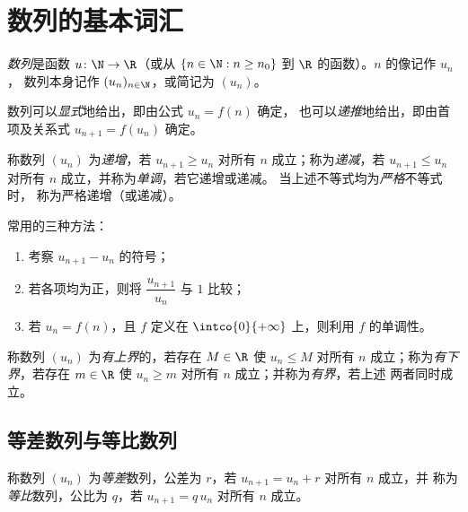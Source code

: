 \section{数列的基本词汇}

\begin{definition}[数列]\label{def:g12:seq:sequence}
\emph{数列}是函数 $u \colon \N \to \R$（或从
$\{n \in \N : n \geq n_0\}$ 到 $\R$ 的函数）。$n$ 的像记作 $u_n$，
数列本身记作 $(u_n)_{n\in\N}$，或简记为 $(u_n)$。
\end{definition}

数列可以\emph{显式}地给出，即由公式 $u_n = f(n)$ 确定，
也可以\emph{递推}地给出，即由首项及关系式 $u_{n+1} = f(u_n)$ 确定。

\begin{definition}[单调性]\label{def:g12:seq:monotonic}
称数列 $(u_n)$ 为\emph{递增}，若
$u_{n+1} \geq u_n$ 对所有 $n$ 成立；称为\emph{递减}，若
$u_{n+1} \leq u_n$ 对所有 $n$ 成立，并称为\emph{单调}，若它递增或递减。
当上述不等式均为\emph{严格}不等式时，
称为严格递增（或递减）。
\end{definition}

\begin{method}[研究数列单调性的方法]\label{met:g12:seq:monotonicity}
常用的三种方法：
\begin{enumerate}
  \item 考察 $u_{n+1} - u_n$ 的符号；
  \item 若各项均为正，则将 $\dfrac{u_{n+1}}{u_n}$ 与 $1$ 比较；
  \item 若 $u_n = f(n)$，且 $f$ 定义在 $\intco{0}{+\infty}$ 上，则利用
        $f$ 的单调性。
\end{enumerate}
\end{method}

\begin{definition}[有界数列]\label{def:g12:seq:bounded}
称数列 $(u_n)$ 为\emph{有上界}的，若存在
$M \in \R$ 使 $u_n \leq M$ 对所有 $n$ 成立；称为\emph{有下界}，若存在
$m \in \R$ 使 $u_n \geq m$ 对所有 $n$ 成立；并称为\emph{有界}，若上述
两者同时成立。
\end{definition}

\subsection{等差数列与等比数列}

\begin{definition}[等差数列与等比数列]\label{def:g12:seq:arith-geom}
称数列 $(u_n)$ 为\emph{等差}数列，公差为 $r$，若
$u_{n+1} = u_n + r$ 对所有 $n$ 成立，并
称为\emph{等比}数列，公比为 $q$，若
$u_{n+1} = q\,u_n$ 对所有 $n$ 成立。
\end{definition}

